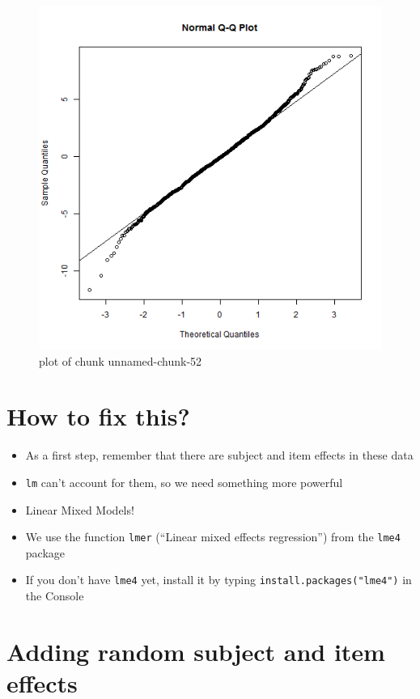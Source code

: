 \documentclass[]{article}
\begin{document}
\begin{figure}[htbp]
\centering
\includegraphics{Class6-figure/unnamed-chunk-52.png}
\caption{plot of chunk unnamed-chunk-52}
\end{figure}

\section{How to fix this?}\label{how-to-fix-this}

\begin{itemize}
\itemsep1pt\parskip0pt
\item
  As a first step, remember that there are subject and item effects in
  these data
\item
  \texttt{lm} can't account for them, so we need something more powerful
\item
  Linear Mixed Models!
\item
  We use the function \texttt{lmer} (``Linear mixed effects
  regression'') from the \texttt{lme4} package
\item
  If you don't have \texttt{lme4} yet, install it by typing
  \texttt{install.packages("lme4")} in the Console
\end{itemize}

\section{Adding random subject and item
effects}\label{adding-random-subject-and-item-effects}
\end{document}
